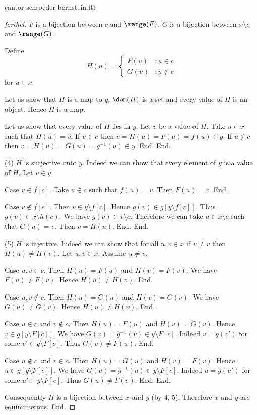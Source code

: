 \documentclass{naproche-library}
\begin{document}
\begin{smodule}{cantor-schroeder-bernstein.ftl}
\begin{proof}[forthel]
      $F$ is a bijection between $c$ and $\range(F)$.
      $G$ is a bijection between $x \setminus c$ and $\range(G)$.

      Define \[ H(u) =
        \begin{cases}
          F(u) & : u \in c \\
          G(u) & : u \notin c
        \end{cases} \]
      for $u \in x$.

      Let us show that $H$ is a map to $y$.
        $\dom(H)$ is a set and every value of $H$ is an object.
        Hence $H$ is a map.

        Let us show that every value of $H$ lies in $y$.
          Let $v$ be a value of $H$.
          Take $u \in x$ such that $H(u) = v$.
          If $u \in c$ then $v = H(u) = F(u) = f(u) \in y$.
          If $u \notin c$ then $v = H(u) = G(u) = g^{-1}(u) \in y$.
        End.
      End.

      (4) $H$ is surjective onto $y$.
      Indeed we can show that every element of $y$ is a value of $H$.
        Let $v \in y$.

        Case $v \in f[c]$.
          Take $u \in c$ such that $f(u) = v$.
          Then $F(u) = v$.
        End.

        Case $v \notin f[c]$.
          Then $v \in y \setminus f[c]$.
          Hence $g(v) \in g[y \setminus f[c]]$.
          Thus $g(v) \in x \setminus h(c)$.
          We have $g(v) \in x \setminus c$.
          Therefore we can take $u \in x \setminus c$ such that $G(u) = v$.
          Then $v = H(u)$.
        End.
      End.

      (5) $H$ is injective.
      Indeed we can show that for all $u, v \in x$ if $u \neq v$ then $H(u) \neq H(v)$.
        Let $u,v \in x$.
        Assume $u \neq v$.

        Case $u,v \in c$.
          Then $H(u) = F(u)$ and $H(v) = F(v)$.
          We have $F(u) \neq F(v)$.
          Hence $H(u) \neq H(v)$.
        End.

        Case $u,v \notin c$.
          Then $H(u) = G(u)$ and $H(v) = G(v)$.
          We have $G(u) \neq G(v)$.
          Hence $H(u) \neq H(v)$.
        End.

        Case $u \in c$ and $v \notin c$.
          Then $H(u) = F(u)$ and $H(v) = G(v)$.
          Hence $v \in g[y \setminus F[c]]$.
          We have $G(v) = g^{-1}(v) \in y \setminus F[c]$.
          Indeed $v = g(v')$ for some $v' \in y \setminus F[c]$.
          Thus $G(v) \neq F(u)$.
        End.

        Case $u \notin c$ and $v \in c$.
          Then $H(u) = G(u)$ and $H(v) = F(v)$.
          Hence $u \in g[y \setminus F[c]]$.
          We have $G(u) = g^{-1}(u) \in y \setminus F[c]$.
          Indeed $u = g(u')$ for some $u' \in y \setminus F[c]$.
          Thus $G(u) \neq F(v)$.
        End.
      End.

      Consequently $H$ is a bijection between $x$ and $y$ (by 4, 5).
      Therefore $x$ and $y$ are equinumerous.
    End.
  \end{proof}
\end{smodule}
\end{document}
